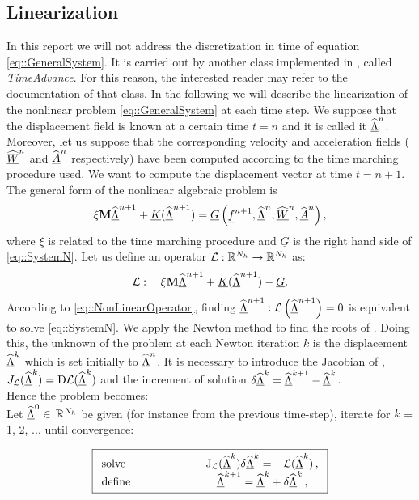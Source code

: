 \subsection{Linearization}
\label{sct-Linear} In this report we will not address the
discretization in time of equation \eqref{eq::GeneralSystem}. It is
carried out by another class implemented in \LV, called
\textit{TimeAdvance}. For this reason, the interested reader may refer
to the documentation of that class. In the following we will describe
the linearization of the nonlinear problem \eqref{eq::GeneralSystem}
at each time step. We suppose that the displacement field is known at
a certain time $t=n$ and it is called it $\widehat{\underline{\Lambda}}^n$. Moreover, let us suppose
that the corresponding velocity and acceleration fields ($\widehat{\underline{W}}^n$
and $\widehat{\underline{A}}^n$ respectively) have been computed according to the time
marching procedure used. We want to compute the displacement vector at
time $t=n+1$. The general form of the nonlinear algebraic problem is
\begin{equation}
  \xi\textbf{M}\widehat{\underline{\Lambda}}^{n+1}+\underline{K}(\widehat{\underline{\Lambda}}^{n+1})=\underline{G}\left(\underline{f}^{n+1},
  \widehat{\underline{\Lambda}}^n,\widehat{\underline{W}}^n,\widehat{\underline{A}}^n\right),
  \label{eq::SystemN}
\end{equation}
where $\xi$ is related to the time marching procedure
and $\underline{G}$ is the right hand side of \eqref{eq::SystemN}. Let
us define an operator $\mathcal{L}:\mathbb{R}^{N_h}\to\mathbb{R}^{N_h}$ as:
\begin{equation}
  \mathcal{L}:\quad\xi\textbf{M}\widehat{\underline{\Lambda}}^{n+1}+\underline{K}(\widehat{\underline{\Lambda}}^{n+1})-\underline{G}.
  \label{eq::NonLinearOperator}
\end{equation}
According to \eqref{eq::NonLinearOperator}, finding
$\widehat{\underline{\Lambda}}^{n+1}:\mathcal{L}\left(\widehat{\underline{\Lambda}}^{n+1}\right)=0$ is equivalent to solve
\eqref{eq::SystemN}. We apply the Newton method to find the roots of
\Lne. Doing this, the unknown of the problem at each Newton iteration
$k$ is the displacement $\widehat{\underline{\Lambda}}^{k}$ which is set initially to
$\widehat{\underline{\Lambda}}^{n}$. It is necessary to introduce the Jacobian of \Lne,
$J_{\text{$\mathcal{L}$}}(\widehat{\underline{\Lambda}}^{k}) = \text{D}\mathcal{L}(\widehat{\underline{\Lambda}}^{k})$ and the
increment of solution $\delta\widehat{\underline{\Lambda}}^{k} = \widehat{\underline{\Lambda}}^{k+1} -
\widehat{\underline{\Lambda}}^{k}$.\\ Hence the problem becomes:\\

Let $\widehat{\underline{\Lambda}}^{0} \in$ $\mathbb{R}^{N_h}$ be given (for instance from the previous
time-step), iterate for $k$ = 1, 2, ...  until convergence:

\begin{equation} \boxed{
    \begin{array}{lc} \mbox{solve} & \hspace{2cm}
      \text{J}_{\mathcal{L}}(\widehat{\underline{\Lambda}}^{k})\delta\widehat{\underline{\Lambda}}^{k} = -\mathcal{L}(\widehat{\underline{\Lambda}}^{k})\,,\\
      \mbox{define} & \hspace{2cm} \widehat{\underline{\Lambda}}^{k + 1} = \widehat{\underline{\Lambda}}^{k} +
      \delta\widehat{\underline{\Lambda}}^{k}\,,
    \end{array} }
  \label{RichardsonI}
\end{equation}

